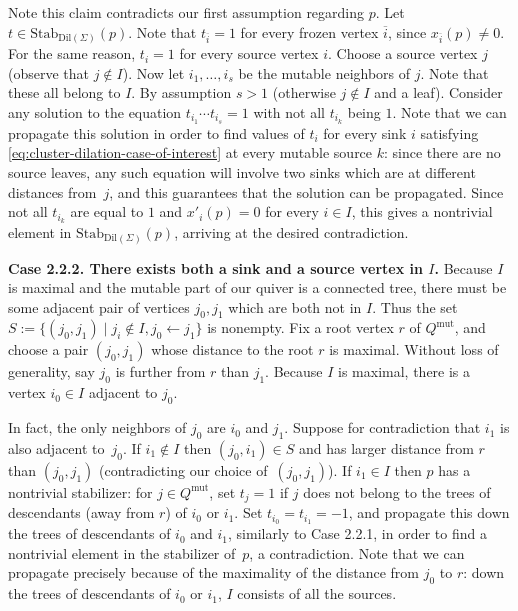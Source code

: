 \documentclass{amsart}
\newcommand{\seed}{\Sigma}
\newcommand{\mut}{\mathrm{mut}}
\newcommand{\Stab}{\mathrm{Stab}}
\numberwithin{equation}{section}
\theoremstyle{definition}
\newcommand{\dil}{\mathrm{Dil}}
\newcommand{\cS}[1]{\textcolor{purple}{[SN: \footnotesize $\blacksquare$ #1 $\blacksquare$]}}
\begin{document}
Note this claim contradicts our first assumption regarding $p$.
Let $t \in \Stab_{\dil(\seed)}(p)$. Note that $t_{\overline{i}} = 1$ for every frozen vertex $\overline{i}$, since $x_{\overline{i}}(p) \neq 0$. For the same reason, $t_{i} = 1$ for every source vertex $i$. 
Choose a source vertex $j$ (observe that $j \not \in I$). 
Now let $i_1, \dots, i_s$ be the mutable neighbors of $j$. Note that these all belong to $I$. By assumption $s > 1$ (otherwise $j \not \in I$ and a leaf). Consider any solution to the equation $t_{i_1}\cdots t_{i_s} = 1$ with not all $t_{i_k}$ being $1$. Note that we can propagate this solution in order to find values of $t_i$ for every sink $i$ satisfying \eqref{eq:cluster-dilation-case-of-interest} at every mutable source $k$: since there are no source leaves, any such equation will involve two sinks which are at different distances from~$j$, and this guarantees that the solution can be propagated. Since not all $t_{i_k}$ are equal to $1$ and $x'_{i}(p) = 0$ for every $i \in I$, this gives a nontrivial element in $\Stab_{\dil(\seed)}(p)$, arriving at the desired contradiction.

{\bf Case 2.2.2. There exists both a sink and a source vertex in $I$.} %
Because $I$ is maximal and the mutable part of our quiver is a connected tree, there must be some adjacent pair of vertices $j_0, j_1$ which are both not in $I$. 
Thus the set $S := \{(j_0,j_1) \mid j_i \not \in I, j_0 \leftarrow j_1\}$ is nonempty.
Fix a root vertex $r$ of $Q^{\mut}$, and choose a pair $(j_0,j_1)$ whose distance to the root $r$ is maximal.
Without loss of generality, say $j_0$ is further from $r$ than $j_1$.
Because $I$ is maximal, there is a vertex $i_0 \in I$ adjacent to $j_0$.

In fact, the only neighbors of $j_0$ are $i_0$ and $j_1$.
Suppose for contradiction that $i_1$ is also adjacent to~$j_0$.
If $i_1 \not \in I$ then  $(j_0,i_1) \in S$ and has larger distance from $r$ than $(j_0, j_1)$ (contradicting our choice of~${(j_0, j_1)}$).
If $i_1 \in I$ then $p$ has a nontrivial stabilizer: 
for $j \in Q^{\mut}$, set $t_j = 1$ if $j$ does not belong to the trees of descendants (away from $r$) of $i_0$ or $i_1$. 
Set $t_{i_0} = t_{i_1} = -1$, and propagate this down the trees of descendants of $i_0$ and $i_1$, similarly to Case 2.2.1, in order to find a nontrivial element in the  stabilizer of~$p$, a contradiction.  
Note that we can propagate precisely because of the maximality of the distance from $j_0$ to $r$: down the trees of descendants of $i_0$ or $i_1$, $I$ consists of all the sources.
\end{document}
